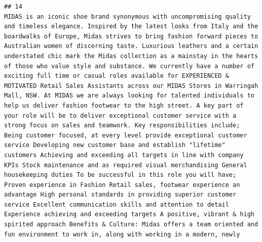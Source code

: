 \documentclass[11pt,a4paper,]{article}
\begin{document}
\begin{verbatim}
## 14                                                                                                                                                                                                                                                                                                                                                                                                                                                                                                                                                                                                                                                                                                                                                                                                                                                                                                                                                                                                                                                                                                                                                                                                                                                                                                                                                                                                                                                                                                                                                                                                                                                                                                                                                                                                                           MIDAS is an iconic shoe brand synonymous with uncompromising quality and timeless elegance. Inspired by the latest looks from Italy and the boardwalks of Europe, Midas strives to bring fashion forward pieces to Australian women of discerning taste. Luxurious leathers and a certain understated chic mark the Midas collection as a mainstay in the hearts of those who value style and substance. We currently have a number of exciting full time or casual roles available for EXPERIENCED & MOTIVATED Retail Sales Assistants across our MIDAS Stores in Warringah Mall, NSW. At MIDAS we are always looking for talented individuals to help us deliver fashion footwear to the high street. A key part of your role will be to deliver exceptional customer service with a strong focus on sales and teamwork. Key responsibilities include; Being customer focused, at every level provide exceptional customer service Developing new customer base and establish "lifetime" customers Achieving and exceeding all targets in line with company KPIs Stock maintenance and as required visual merchandising General housekeeping duties To be successful in this role you will have; Proven experience in Fashion Retail sales, footwear experience an advantage High personal standards in providing superior customer service Excellent communication skills and attention to detail Experience achieving and exceeding targets A positive, vibrant & high spirited approach Benefits & Culture: Midas offers a team oriented and fun environment to work in, along with working in a modern, newly 
\end{verbatim}
\end{document}
